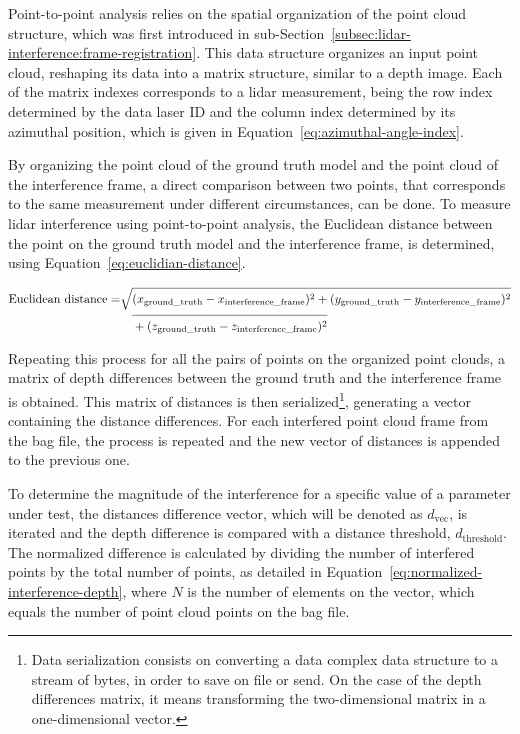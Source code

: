 Point-to-point analysis relies on the spatial organization of the point cloud structure, which was first introduced in sub-Section~\ref{subsec:lidar-interference:frame-registration}. This data structure organizes an input point cloud, reshaping its data into a matrix structure, similar to a depth image. Each of the matrix indexes corresponds to a \ac{lidar} measurement, being the row index determined by the data \ac{laser} ID and the column index determined by its azimuthal position, which is given in Equation~\eqref{eq:azimuthal-angle-index}. 

By organizing the point cloud of the ground truth model and the point cloud of the interference frame, a direct comparison between two points, that corresponds to the same measurement under different circumstances, can be done. To measure \ac{lidar} interference using point-to-point analysis, the Euclidean distance between the point on the ground truth model and the interference frame, is determined, using Equation~\eqref{eq:euclidian-distance}.

\begin{equation}
\label{eq:euclidian-distance}
\begin{split}
\displaystyle
\text{Euclidean distance} = & \sqrt{(x_{\text{ground\_truth}} - x_{\text{interference\_frame}})^2 + (y_{\text{ground\_truth}} - y_{\text{interference\_frame}})^2} \\
														& \displaystyle \quad \overline{\rule{0pt}{2.5ex} + (z_{\text{ground\_truth}} - z_{\text{interference\_frame}})^2 }
\end{split}
\end{equation}

Repeating this process for all the pairs of points on the organized point clouds, a matrix of depth differences between the ground truth and the interference frame is obtained. This matrix of distances is then serialized\footnote{Data serialization consists on converting a data complex data structure to a stream of bytes, in order to save on file or send. On the case of the depth differences matrix, it means transforming the two-dimensional matrix in a one-dimensional vector.}, generating a vector containing the distance differences. For each interfered point cloud frame from the bag file, the process is repeated and the new vector of distances is appended to the previous one. 

To determine the magnitude of the interference for a specific value of a parameter under test, the distances difference vector, which will be denoted as $d_\text{vec}$, is iterated and the depth difference is compared with a distance threshold, $d_\text{threshold}$. The normalized difference is calculated by dividing the number of interfered points by the total number of points, as detailed in Equation~\eqref{eq:normalized-interference-depth}, where $N$ is the number of elements on the vector, which equals the number of point cloud points on the bag file.

